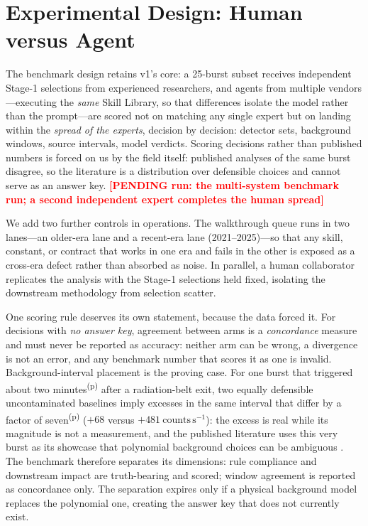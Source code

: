 \documentclass[twocolumn]{aastex631}
\newcommand{\PENDING}[1]{\textbf{\textcolor{red}{[PENDING run: #1]}}}
\newcommand{\prov}{\textsuperscript{(p)}}
\begin{document}
\section{Experimental Design: Human versus Agent} \label{sec:design}
The benchmark design retains v1's core: a 25-burst subset receives
independent Stage-1 selections from experienced researchers, and agents from
multiple vendors---executing the \emph{same} Skill Library, so that
differences isolate the model rather than the prompt---are scored not on
matching any single expert but on landing within the \emph{spread of the
experts}, decision by decision: detector sets, background windows, source
intervals, model verdicts. Scoring decisions rather than published numbers
is forced on us by the field itself: published analyses of the same burst
disagree, so the literature is a distribution over defensible choices and
cannot serve as an answer key. \PENDING{the multi-system benchmark run; a
second independent expert completes the human spread}

We add two further controls in operations. The walkthrough queue runs in two
lanes---an older-era lane and a recent-era lane (2021--2025)---so that any
skill, constant, or contract that works in one era and fails in the other
is exposed as a cross-era defect rather than absorbed as noise. In
parallel, a human collaborator replicates the analysis with the Stage-1
selections held fixed, isolating the downstream methodology from
selection scatter.

One scoring rule deserves its own statement, because the data forced it.
For decisions with \emph{no answer key}, agreement between arms is a
\emph{concordance} measure and must never be reported as accuracy:
neither arm can be wrong, a divergence is not an error, and any benchmark
number that scores it as one is invalid. Background-interval placement is
the proving case. For one burst that triggered about two minutes\prov{}
after a radiation-belt exit, two equally defensible uncontaminated
baselines imply excesses in the same interval that differ by a factor of
seven\prov{} ($+68$ versus $+481~\mathrm{counts\,s^{-1}}$): the excess is
real while its magnitude is not a measurement, and the published
literature uses this very burst as its showcase that polynomial
background choices can be ambiguous \citep{2020A&A...640A...8B}. The
benchmark therefore separates its dimensions: rule compliance and
downstream impact are truth-bearing and scored; window agreement is
reported as concordance only. The separation expires only if a physical
background model replaces the polynomial one, creating the answer key
that does not currently exist.
\end{document}
